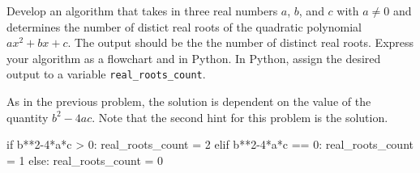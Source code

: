 \documentclass{ximera}
\begin{document}
\begin{question}
	Develop an algorithm that takes in three real numbers $a$, $b$, and $c$ with $a\neq 0$ and determines the number of distict real roots of the quadratic polynomial $ax^2+bx+c$. The output should be the the number of distinct real roots. Express your algorithm as a flowchart and in Python. In Python, assign the desired output to a variable \verb|real_roots_count|.
	\begin{hint}
	As in the previous problem, the solution is dependent on the value of the quantity $b^2-4ac$. Note that the second hint for this problem is the solution.
	\end{hint}
	\begin{hint}
		\begin{center}
		\end{center}
\begin{sageCell}
if b**2-4*a*c > 0:
	real_roots_count = 2
elif b**2-4*a*c == 0:
	real_roots_count = 1
else:
	real_roots_count = 0
\end{sageCell}
	\end{hint}
\end{question}
\end{document}
